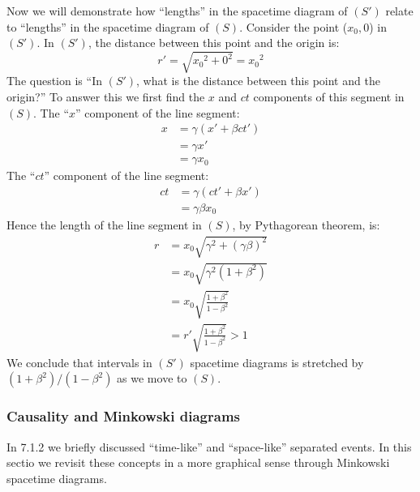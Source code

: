 \documentclass[a4paper,11pt]{article}
\numberwithin{equation}{section}
\begin{document}
\noindent Now we will demonstrate how ``lengths'' in the spacetime diagram of $(S')$ relate to ``lengths'' in the spacetime diagram of $(S)$. Consider the point ($x_0, 0$) in $(S')$. In $(S')$, the distance between this point and the origin is:
\begin{equation}
r'=\sqrt{{x_0}^2 + 0^2}={x_0}^2
\end{equation}
\noindent The question is ``In $(S')$, what is the distance between this point and the origin?'' To answer this we first find the $x$ and $ct$ components of this segment in $(S)$. The ``$x$'' component of the line segment:
\begin{equation}
\begin{split}
x&=\gamma(x'+\beta ct')\\
&=\gamma x' \\
&= \gamma x_0
\end{split}
\end{equation}
\noindent The ``$ct$'' component of the line segment:
\begin{equation}
\begin{split}
ct&=\gamma(ct'+\beta x')\\
&=\gamma\beta x_0
\end{split}
\end{equation}
\noindent Hence the length of the line segment in $(S)$, by Pythagorean theorem, is:
\begin{equation}
\begin{split}
r&=x_0\sqrt{\gamma^2 + (\gamma\beta)^2} \\
&=x_0\sqrt{\gamma^2(1+\beta^2)} \\
&=x_0\sqrt{\frac{1+\beta^2}{1-\beta^2}} \\
&=r'\sqrt{\frac{1+\beta^2}{1-\beta^2}} > 1
\end{split}
\end{equation}
We conclude that intervals in $(S')$ spacetime diagrams is stretched by $(1+\beta^2)/(1-\beta^2)$ as we move to $(S)$.
 
 \subsubsection{Causality and Minkowski diagrams}
 \noindent In 7.1.2 we briefly discussed ``time-like'' and ``space-like'' separated events. In this sectio we revisit these concepts in a more graphical sense through Minkowski spacetime diagrams.
 
\end{document}
